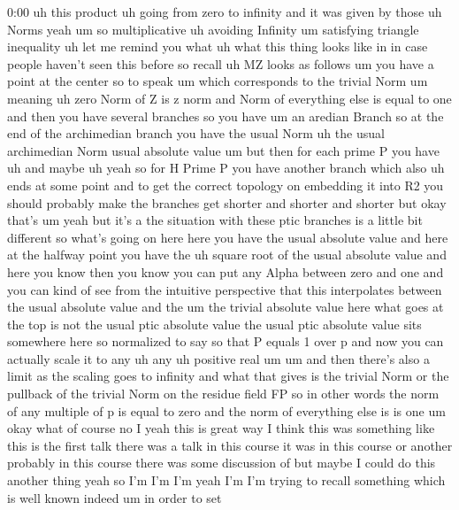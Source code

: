 \begin{unfinished}{0:00}
uh  this
product  uh  going  from  zero  to  infinity
and  it  was  given  by  those  uh
Norms
yeah  um  so
multiplicative  uh  avoiding  Infinity  um
satisfying  triangle
inequality
uh  let  me  remind  you  what  uh  what  this
thing  looks  like  in  in  case  people
haven't  seen  this  before  so
recall  uh  MZ  looks  as
follows
um  you  have  a  point  at  the  center  so  to
speak  um  which  corresponds  to  the
trivial  Norm
um  meaning  uh  zero  Norm  of  Z  is  z  norm
and  Norm  of  everything  else  is  equal  to
one  and  then  you  have  several  branches
so  you  have  um  an  aredian  Branch  so  at
the  end  of  the  archimedian  branch  you
have  the  usual  Norm  uh  the  usual
archimedian
Norm  usual  absolute
value  um  but  then  for  each  prime  P  you
have  uh  and  maybe  uh  yeah  so  for  H  Prime
P  you  have  another  branch  which  also  uh
ends  at  some  point  and  to  get  the
correct  topology  on  embedding  it  into  R2
you  should  probably  make  the  branches
get  shorter  and  shorter  and  shorter  but
okay  that's
um  yeah  but  it's  a  the  situation  with
these  ptic  branches  is  a  little  bit
different  so  what's  going  on  here  here
you  have  the  usual  absolute  value  and
here  at  the  halfway  point  you  have  the
uh  square  root  of  the  usual  absolute
value  and  here  you  know  then  you  know
you  can  put  any  Alpha  between  zero  and
one  and  you  can  kind  of  see  from  the
intuitive  perspective  that  this
interpolates  between  the  usual  absolute
value  and  the  um  the  trivial  absolute
value  here  what  goes  at  the  top  is  not
the  usual  ptic  absolute  value  the  usual
ptic  absolute  value  sits  somewhere  here
so  normalized  to  say  so  that  P  equals  1
over  p  and  now  you  can  actually  scale  it
to  any
uh  any  uh  positive
real
um  um  and  then  there's  also  a  limit  as
the  scaling  goes  to  infinity  and  what
that  gives  is  the  trivial  Norm  or  the
pullback  of  the  trivial  Norm  on  the
residue  field
FP  so  in  other  words  the  norm  of  any
multiple  of  p  is  equal  to  zero  and  the
norm  of  everything  else  is  is
one
um
okay
what  of
course  no  I
yeah  this  is  great  way  I  think  this  was
something  like  this  is  the  first  talk
there  was  a  talk  in  this
course  it  was  in  this  course  or  another
probably  in  this  course  there  was  some
discussion  of  but  maybe  I  could  do  this
another  thing  yeah  so  I'm  I'm  I'm  yeah
I'm  I'm  trying  to  recall  something  which
is  well  known  indeed  um  in  order  to  set

\end{unfinished}
